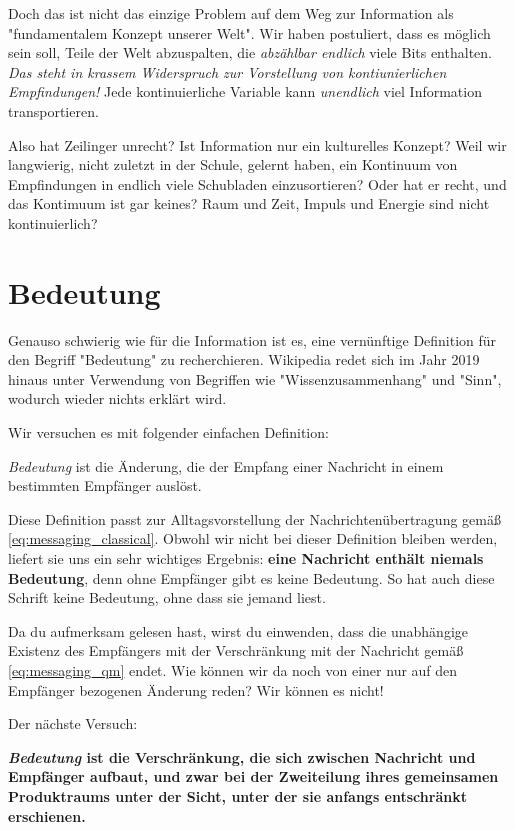 \documentclass[12pt]{book}
\begin{document}
Doch das ist nicht das einzige Problem auf dem Weg zur Information als "fundamentalem Konzept unserer Welt". Wir haben postuliert, dass es möglich sein soll, Teile der Welt abzuspalten, die \emph{abzählbar endlich} viele Bits enthalten. \emph{Das steht in krassem Widerspruch zur Vorstellung von kontiunierlichen Empfindungen!} Jede kontinuierliche Variable kann \emph{unendlich} viel Information transportieren. 

Also hat Zeilinger unrecht? Ist Information nur ein kulturelles Konzept? Weil wir langwierig, nicht zuletzt in der Schule, gelernt haben, ein Kontinuum von Empfindungen in endlich viele Schubladen einzusortieren? Oder hat er recht, und das Kontimuum ist gar keines? Raum und Zeit, Impuls und Energie sind nicht kontinuierlich?

\section{Bedeutung}

Genauso schwierig wie für die Information ist es, eine vernünftige Definition für den Begriff "Bedeutung" zu recherchieren. Wikipedia redet sich im Jahr 2019 hinaus unter Verwendung von Begriffen wie "Wissenzusammenhang" und "Sinn", wodurch wieder nichts erklärt wird. 

Wir versuchen es mit folgender einfachen Definition:

\emph{Bedeutung} ist die Änderung, die der Empfang einer Nachricht in einem bestimmten Empfänger auslöst. 

Diese Definition passt zur Alltagsvorstellung der Nachrichtenübertragung gemäß \eqref{eq:messaging_classical}. Obwohl wir nicht bei dieser Definition bleiben werden, liefert sie uns ein sehr wichtiges Ergebnis: \textbf{eine Nachricht enthält niemals Bedeutung}, denn ohne Empfänger gibt es keine Bedeutung. So hat auch diese Schrift keine Bedeutung, ohne dass sie jemand liest.

Da du aufmerksam gelesen hast, wirst du einwenden, dass die unabhängige Existenz des Empfängers mit der Verschränkung mit der Nachricht gemäß \eqref{eq:messaging_qm} endet. Wie können wir da noch von einer nur auf den Empfänger bezogenen Änderung reden? Wir können es nicht!

Der nächste Versuch: 

\textbf{\emph{Bedeutung} ist die Verschränkung, die sich zwischen Nachricht und Empfänger aufbaut, und zwar bei der Zweiteilung ihres gemeinsamen Produktraums unter der Sicht, unter der sie anfangs entschränkt erschienen.}
\end{document}
